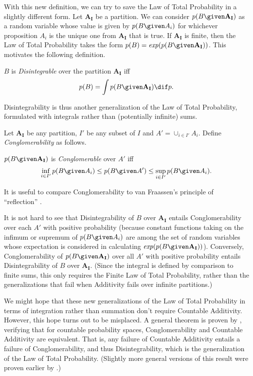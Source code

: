 With this new definition, we can try to save the Law of Total Probability in a slightly different form. Let $\mathbf{A_I}$ be a partition. We can consider $p(B \given \mathbf{A_I})$ as a random variable whose value is given by $p(B \given A_i)$ for whichever proposition $A_i$ is the unique one from $\mathbf{A_I}$ that is true. If $\mathbf{A_I}$ is finite, then the Law of Total Probability takes the form $p(B)=\text{\textit{exp}}(p(B \given \mathbf{A_I}))$. This motivates the following definition.
\begin{definition}\label{disintegrable}
$B$ is \emph{Disintegrable} over the partition $\mathbf{A_I}$ iff $$p(B)=\int p(B \given \mathbf{A_I}) \dif p.$$
\end{definition}
Disintegrability is thus another generalization of the Law of Total Probability, formulated with integrals rather than (potentially infinite) sums.

Let $\mathbf{A_I}$ be any partition, $I'$ be any subset of $I$ and $A'=\cup_{i\in I'}A_i$. Define \textit{Conglomerability} as follows.
\begin{definition}\label{conglomerable}
$p(B \given \mathbf{A_I})$ is \emph{Conglomerable} over $A'$ iff
$$\inf_{i\in I'} p(B \given A_i)\leq p(B \given A')\leq \sup_{i\in I'} p(B \given A_i).$$
\end{definition}
It is useful to compare Conglomerability to van Fraassen's principle of ``reflection'' \citep{belandwill, distrefl}.

It is not hard to see that Disintegrability of $B$ over $\mathbf{A_I}$ entails Conglomerability over each $A'$ with positive probability (because constant functions taking on the infimum or supremum of $p(B \given A_i)$ are among the set of random variables whose expectation is considered in calculating $\text{\textit{exp}}(p(B \given \mathbf{A_I}))$). Conversely, Conglomerability of $p(B \given \mathbf{A_I})$ over all $A'$ with positive probability entails Disintegrability of $B$ over $\mathbf{A_I}$. (Since the integral is defined by comparison to finite sums, this only requires the Finite Law of Total Probability, rather than the generalizations that fail when Additivity fails over infinite partitions.) 

We might hope that these new generalizations of the Law of Total Probability in terms of integration rather than summation don't require Countable Additivity. However, this hope turns out to be misplaced. A general theorem is proven by \citet{conglom}, verifying that for countable probability spaces, Conglomerability and Countable Additivity are equivalent. That is, any failure of Countable Additivity entails a failure of Conglomerability, and thus Disintegrability, which is the generalization of the Law of Total Probability. (Slightly more general versions of this result were proven earlier by \citealp{nonconglom}.)

